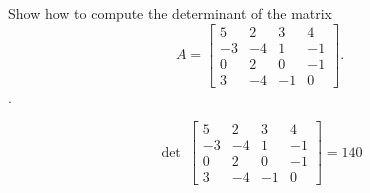 
\begin{exerciseStatement}


Show how to compute the determinant of the matrix \[A= \left[\begin{array}{cccc}
5 & 2 & 3 & 4 \\
-3 & -4 & 1 & -1 \\
0 & 2 & 0 & -1 \\
3 & -4 & -1 & 0
\end{array}\right] .\].


\end{exerciseStatement}
    
\begin{exerciseAnswer} 
\[\operatorname{det}\  \left[\begin{array}{cccc}
5 & 2 & 3 & 4 \\
-3 & -4 & 1 & -1 \\
0 & 2 & 0 & -1 \\
3 & -4 & -1 & 0
\end{array}\right] = 140 \]
\end{exerciseAnswer}
    
